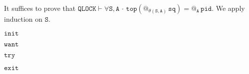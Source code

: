 \documentclass{article}
\makeatletter
\newcommand{\A}{\mathtt{A}}
\renewcommand{\S}{\mathtt{S}}
\newcommand{\pid}{{\mathtt{pid}}}
\newcommand{\sq}{{\mathtt{sq}}}
\newcommand{\QLOCK}{{\mathtt{QLOCK}}}
\newcommand{\Top}{{\mathtt{top}}}
\newcommand{\init}{{\mathtt{init}}}
\newcommand{\want}{{\mathtt{want}}}
\newcommand{\try}{{\mathtt{try}}}
\newcommand{\exit}{{\mathtt{exit}}}
\newcommand{\at}[1]{@_{#1}\,}
\newcommand{\Forall}[1]{\forall #1\,{\cdot}\,}
\makeatother
\begin{document}
It suffices to prove that $\QLOCK\vdash \Forall{\S,\A} \Top(\at{\theta(\S,\A)}\sq)=\at{\A}\pid $.
We apply induction on $\S$.
\begin{proofcases}[itemsep=1ex]
\item[$\init$]
 
\item[$\want$]

\item[$\try$]

\item[$\exit$]
\end{proofcases}
\end{document}
